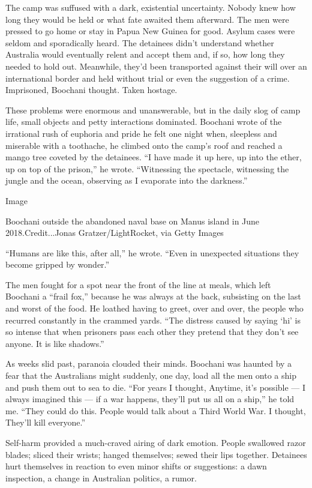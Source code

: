 The camp was suffused with a dark, existential uncertainty. Nobody knew
how long they would be held or what fate awaited them afterward. The men
were pressed to go home or stay in Papua New Guinea for good. Asylum
cases were seldom and sporadically heard. The detainees didn't
understand whether Australia would eventually relent and accept them
and, if so, how long they needed to hold out. Meanwhile, they'd been
transported against their will over an international border and held
without trial or even the suggestion of a crime. Imprisoned, Boochani
thought. Taken hostage.

These problems were enormous and unanswerable, but in the daily slog of
camp life, small objects and petty interactions dominated. Boochani
wrote of the irrational rush of euphoria and pride he felt one night
when, sleepless and miserable with a toothache, he climbed onto the
camp's roof and reached a mango tree coveted by the detainees. ``I have
made it up here, up into the ether, up on top of the prison,'' he wrote.
``Witnessing the spectacle, witnessing the jungle and the ocean,
observing as I evaporate into the darkness.''

Image

Boochani outside the abandoned naval base on Manus island in June
2018.Credit...Jonas Gratzer/LightRocket, via Getty Images

``Humans are like this, after all,'' he wrote. ``Even in unexpected
situations they become gripped by wonder.''

The men fought for a spot near the front of the line at meals, which
left Boochani a ``frail fox,'' because he was always at the back,
subsisting on the last and worst of the food. He loathed having to
greet, over and over, the people who recurred constantly in the crammed
yards. ``The distress caused by saying `hi' is so intense that when
prisoners pass each other they pretend that they don't see anyone. It is
like shadows.''

As weeks slid past, paranoia clouded their minds. Boochani was haunted
by a fear that the Australians might suddenly, one day, load all the men
onto a ship and push them out to sea to die. ``For years I thought,
Anytime, it's possible --- I always imagined this --- if a war happens,
they'll put us all on a ship,'' he told me. ``They could do this. People
would talk about a Third World War. I thought, They'll kill everyone.''

Self-harm provided a much-craved airing of dark emotion. People
swallowed razor blades; sliced their wrists; hanged themselves; sewed
their lips together. Detainees hurt themselves in reaction to even minor
shifts or suggestions: a dawn inspection, a change in Australian
politics, a rumor.

